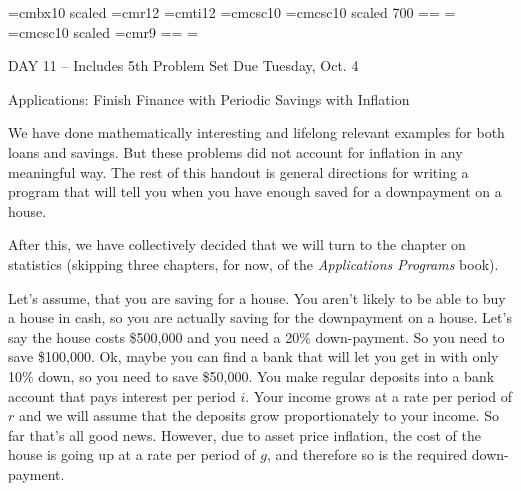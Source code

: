 
\def\folio{\ifnum\pageno>0 \number\pageno \else
   \ifnum\pageno<0 \romannumeral-\pageno \else\fi\fi}

\font\largebf=cmbx10  scaled 
\font\largerm=cmr12
\font\largeit=cmti12
\font\tensc=cmcsc10
\font\sevensc=cmcsc10 scaled 700
\newfam\scfam \def\sc{\fam\scfam\tensc}
\textfont\scfam=\tensc \scriptfont\scfam=\sevensc
\scriptscriptfont\scfam=\sevensc
\font\largesc=cmcsc10 scaled 
\font\ninerm=cmr9
\newfam\srfam \def\sr{\fam\srfam\ninerm}
\textfont\srfam=\ninerm \scriptfont\srfam=\sevenrm
\scriptscriptfont\srfam=\fiverm




\null\vskip36pt

\centerline{\largerm DAY 11 -- Includes 5th Problem Set Due Tuesday, Oct. 4}
\nobreak\bigskip

\centerline{\largeit Applications: Finish Finance with Periodic Savings with Inflation}
\nobreak\bigskip

\nobreak\bigskip

\noindent  We have done mathematically interesting and lifelong relevant examples for both loans and savings. But these problems did not account for inflation in any meaningful way. The rest of this handout is general directions for writing a program that will tell you when you have enough saved for a downpayment on a house.

After this, we have collectively decided that we will turn to the chapter on statistics (skipping three chapters, for now, of the {\it Applications Programs} book).

\bigskip

\nobreak\bigskip

\nobreak\bigskip

\noindent Let's assume, that you are saving for a house. You aren't likely to be able to buy a house in cash, so you are actually saving for the downpayment on a house. Let's say the house costs \$500,000 and you need a 20\% down-payment. So you need to save \$100,000. Ok, maybe you can find a bank that will let you get in with only 10\% down, so you need to save \$50,000. You make regular deposits into a bank account that pays interest per period $i$. Your income grows at a rate per period of $r$ and we will assume that the deposits grow proportionately to your income. So far that's all good news. However, due to asset price inflation, the cost of the house is going up at a rate per period of $g$, and therefore so is the required down-payment.

